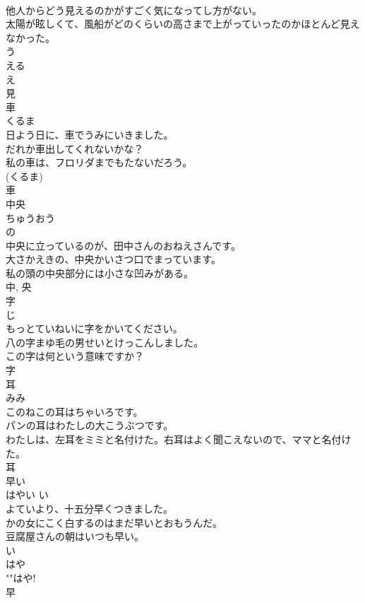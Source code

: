 \documentclass[8pt]{extreport}
\begin{document}
\begin{CJK}{UTF8}{min}
\\	他人からどう見えるのかがすごく気になってし方がない。	
\\	太陽が眩しくて、風船がどのくらいの高さまで上がっていったのかほとんど見えなかった。	
\\	う 
\\	える 
\\	え 
\\	見	
\\	車	
\\	くるま	
\\	日よう日に、車でうみにいきました。	
\\	だれか車出してくれないかな？	
\\	私の車は、フロリダまでもたないだろう。	
\\	(くるま) 
\\	車	
\\	中央	
\\	ちゅうおう	
\\	の 
\\	中央に立っているのが、田中さんのおねえさんです。	
\\	大さかえきの、中央かいさつ口でまっています。	
\\	私の頭の中央部分には小さな凹みがある。	
\\	中, 央	
\\	字	
\\	じ	
\\	もっとていねいに字をかいてください。	
\\	八の字まゆ毛の男せいとけっこんしました。	
\\	この字は何という意味ですか？	
\\	字	
\\	耳	
\\	みみ	
\\	このねこの耳はちゃいろです。	
\\	パンの耳はわたしの大こうぶつです。	
\\	わたしは、左耳をミミと名付けた。右耳はよく聞こえないので、ママと名付けた。	
\\	耳	
\\	早い	
\\	はやい	い 
\\	よていより、十五分早くつきました。	
\\	かの女にこく白するのはまだ早いとおもうんだ。	
\\	豆腐屋さんの朝はいつも早い。	
\\	い 
\\	はや 
\\	""はや!
\\	早	

\end{CJK}
\end{document}
